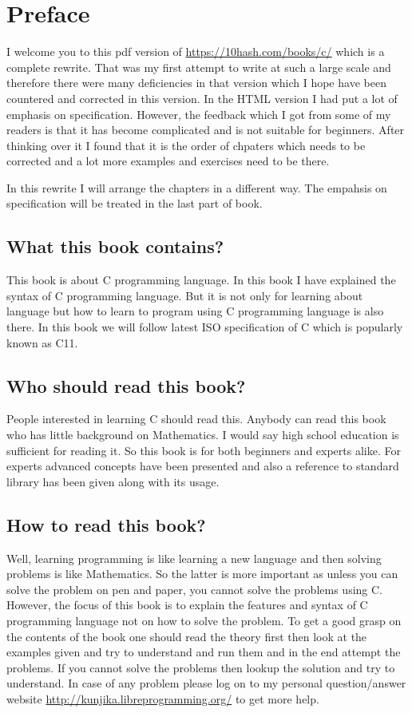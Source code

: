 \chapter{Preface}
I welcome you to this pdf version of 
\url{https://10hash.com/books/c/} which is a complete rewrite. That 
was my first attempt to write at such a large scale and therefore there were 
many deficiencies in that version which I hope have been countered and
corrected in this version. In the HTML version I had put a lot of emphasis on 
specification. However, the feedback which I got from some of my readers is 
that it has become complicated and is not suitable for beginners. After 
thinking over it I found that it is the order of chpaters which needs to be 
corrected and a lot more examples and exercises need to be there.

In this rewrite I will arrange the chapters in a different way. The empahsis on 
specification will be treated in the last part of book.

\section{What this book contains?}
This book is about C programming language. In this book I have explained the
syntax of C programming language. But it is not only for learning about
language but how to learn to program using C programming language is also
there. In this book we will follow latest ISO specification of C which is
popularly known as C11.

\section{Who should read this book?}
People interested in learning C should read this. Anybody can read this book
who has little background on Mathematics. I would say high school education is
sufficient for reading it. So this book is for both beginners and experts
alike. For experts advanced concepts have been presented and also a reference
to standard library has been given along with its usage.

\section{How to read this book?}
Well, learning programming is like learning a new language and then solving
problems is like Mathematics. So the latter is more important as unless you can
solve the problem on pen and paper, you cannot solve the problems using
C. However, the focus of this book is to explain the features and syntax of C
programming language not on how to solve the problem. To get a good grasp
on the contents of the book one should read the theory first then look at the
examples given and try to understand and run them and in the end attempt
the problems. If you cannot solve the problems then lookup the solution and
try to understand. In case of any problem please log on to my personal
question/answer website \url{http://kunjika.libreprogramming.org/} to get
more help.

